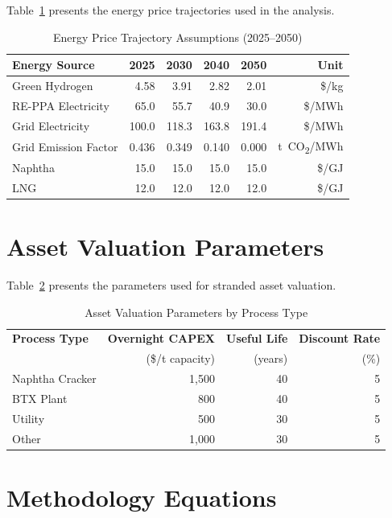 \documentclass[12pt,a4paper]{article}
\newcommand{\COtwo}{CO\textsubscript{2}}
\begin{document}
Table~\ref{tab:price_trajectories} presents the energy price trajectories used in the analysis.

\begin{table}[H]
\centering
\caption{Energy Price Trajectory Assumptions (2025--2050)}
\label{tab:price_trajectories}
\begin{tabular}{@{}lrrrrr@{}}
\toprule
\textbf{Energy Source} & \textbf{2025} & \textbf{2030} & \textbf{2040} & \textbf{2050} & \textbf{Unit} \\
\midrule
Green Hydrogen & 4.58 & 3.91 & 2.82 & 2.01 & \$/kg \\
RE-PPA Electricity & 65.0 & 55.7 & 40.9 & 30.0 & \$/MWh \\
Grid Electricity & 100.0 & 118.3 & 163.8 & 191.4 & \$/MWh \\
Grid Emission Factor & 0.436 & 0.349 & 0.140 & 0.000 & t~\COtwo/MWh \\
Naphtha & 15.0 & 15.0 & 15.0 & 15.0 & \$/GJ \\
LNG & 12.0 & 12.0 & 12.0 & 12.0 & \$/GJ \\
\bottomrule
\end{tabular}
\end{table}

\section{Asset Valuation Parameters}

Table~\ref{tab:asset_params} presents the parameters used for stranded asset valuation.

\begin{table}[H]
\centering
\caption{Asset Valuation Parameters by Process Type}
\label{tab:asset_params}
\begin{tabular}{@{}lrrr@{}}
\toprule
\textbf{Process Type} & \textbf{Overnight CAPEX} & \textbf{Useful Life} & \textbf{Discount Rate} \\
 & (\$/t capacity) & (years) & (\%) \\
\midrule
Naphtha Cracker & 1,500 & 40 & 5 \\
BTX Plant & 800 & 40 & 5 \\
Utility & 500 & 30 & 5 \\
Other & 1,000 & 30 & 5 \\
\bottomrule
\end{tabular}
\end{table}

\section{Methodology Equations}
\end{document}
